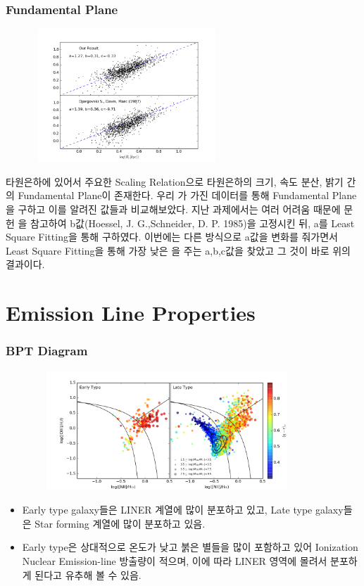 \documentclass[xcolor={dvipsnames,table}]{beamer}
\newcommand\SM{\fontsize{8}{7.2}\selectfont}
\newcommand\SSM{\fontsize{7}{7.2}\selectfont}
\begin{document}
\begin{frame}
 \frametitle{Fundamental Plane}
 \SSM
   \begin{figure}
    \centering
    \includegraphics[width=7cm, height=5cm]{fundplane1.png}
   \end{figure}

\vspace{0.2cm}
타원은하에 있어서 주요한 Scaling Relation으로 타원은하의 크기, 속도 분산, 밝기 간의 Fundamental Plane이 존재한다. 우리
가 가진 데이터를 통해 Fundamental Plane을 구하고 이를 알려진 값들과 비교해보았다. 지난 과제에서는 여러 어려움 때문에 문헌
을 참고하여 b값(Hoessel, J. G.,Schneider, D. P. 1985)을 고정시킨 뒤, a를 Least Square Fitting을 통해 구하였다. 이번에는
다른 방식으로 a값을 변화를 줘가면서 Least Square Fitting을 통해 가장 낮은 을 주는 a,b,c값을 찾았고 그 것이 바로 위의 결과이다.
\end{frame}

\section{Emission Line Properties}

\begin{frame}
  \frametitle{BPT Diagram}
  \SM
  \begin{figure}
    \centering
    \includegraphics[width=10cm, height=4.5cm]{BPT.png}
   \end{figure}
  \vspace{0.2cm}

  \begin{itemize}
   \item Early type galaxy들은 LINER 계열에 많이 분포하고 있고, Late type galaxy들은 Star forming 계열에 많이 분포하고 있음.
   \item Early type은 상대적으로 온도가 낮고 붉은 별들을 많이 포함하고 있어 Ionization Nuclear Emission-line 방출량이 적으며,
   이에 따라 LINER 영역에 몰려서 분포하게 된다고 유추해 볼 수 있음.
  \end{itemize}
\end{frame}
\end{document}
